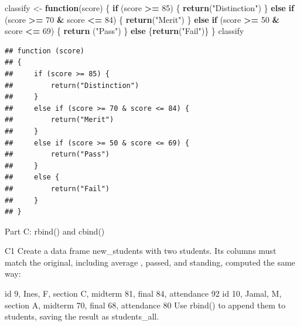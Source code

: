 \documentclass[
]{article}
\newenvironment{Shaded}{\begin{snugshade}}{\end{snugshade}}
\newcommand{\ControlFlowTok}[1]{\textcolor[rgb]{0.13,0.29,0.53}{\textbf{#1}}}
\newcommand{\DecValTok}[1]{\textcolor[rgb]{0.00,0.00,0.81}{#1}}
\newcommand{\FunctionTok}[1]{\textcolor[rgb]{0.13,0.29,0.53}{\textbf{#1}}}
\newcommand{\NormalTok}[1]{#1}
\newcommand{\OtherTok}[1]{\textcolor[rgb]{0.56,0.35,0.01}{#1}}
\newcommand{\SpecialCharTok}[1]{\textcolor[rgb]{0.81,0.36,0.00}{\textbf{#1}}}
\newcommand{\StringTok}[1]{\textcolor[rgb]{0.31,0.60,0.02}{#1}}
\begin{document}
\begin{Shaded}
\begin{Highlighting}[]
\NormalTok{classify }\OtherTok{\textless{}{-}} \ControlFlowTok{function}\NormalTok{(score) \{}
  \ControlFlowTok{if}\NormalTok{ (score }\SpecialCharTok{\textgreater{}=} \DecValTok{85}\NormalTok{) }
\NormalTok{    \{ }\FunctionTok{return}\NormalTok{(}\StringTok{"Distinction"}\NormalTok{)}
\NormalTok{  \} }\ControlFlowTok{else} 
    \ControlFlowTok{if}\NormalTok{ (score }\SpecialCharTok{\textgreater{}=}  \DecValTok{70} \SpecialCharTok{\&}\NormalTok{ score }\SpecialCharTok{\textless{}=} \DecValTok{84}\NormalTok{) \{ }\FunctionTok{return}\NormalTok{(}\StringTok{"Merit"}\NormalTok{) \} }\ControlFlowTok{else} \ControlFlowTok{if}\NormalTok{ (score }\SpecialCharTok{\textgreater{}=} \DecValTok{50} \SpecialCharTok{\&}\NormalTok{ score }\SpecialCharTok{\textless{}=} \DecValTok{69}\NormalTok{) \{ }\FunctionTok{return}\NormalTok{ (}\StringTok{"Pass"}\NormalTok{) \} }\ControlFlowTok{else}\NormalTok{ \{}\FunctionTok{return}\NormalTok{(}\StringTok{"Fail"}\NormalTok{)\}}
\NormalTok{\}}
\NormalTok{classify}
\end{Highlighting}
\end{Shaded}

\begin{verbatim}
## function (score) 
## {
##     if (score >= 85) {
##         return("Distinction")
##     }
##     else if (score >= 70 & score <= 84) {
##         return("Merit")
##     }
##     else if (score >= 50 & score <= 69) {
##         return("Pass")
##     }
##     else {
##         return("Fail")
##     }
## }
\end{verbatim}

Part C: rbind() and cbind()

C1 Create a data frame new\_students with two students. Its columns must
match the original, including average , passed, and standing, computed
the same way:

id 9, Ines, F, section C, midterm 81, final 84, attendance 92 id 10,
Jamal, M, section A, midterm 70, final 68, attendance 80 Use rbind() to
append them to students, saving the result as students\_all.
\end{document}
